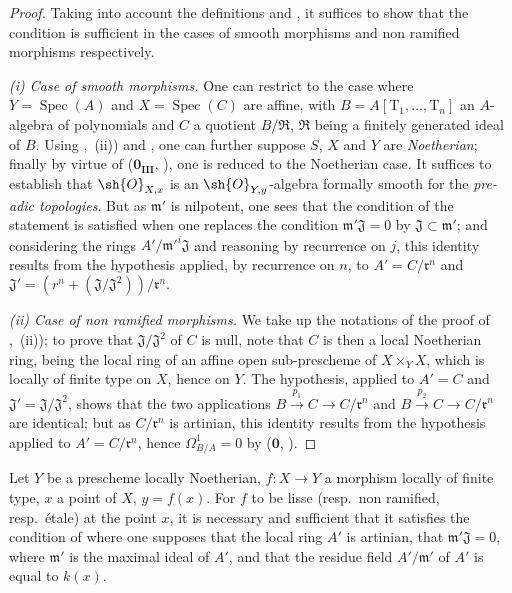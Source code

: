\begin{proof}
Taking into account the definitions  and , it suffices to show that the condition is sufficient in the cases of smooth morphisms and non ramified morphisms respectively.

\emph{(i) Case of smooth morphisms.}
One can restrict to the case where $Y=\operatorname{Spec}(A)$ and $X=\operatorname{Spec}(C)$ are affine, with $B=A[\mathrm{T}_1,\ldots,\mathrm{T}_n]$ an $A$-algebra of polynomials and $C$ a quotient $B/\mathfrak{R}$, $\mathfrak{R}$ being a finitely generated ideal of $B$.
Using ,~(ii)) and , one can further suppose $S$, $X$ and $Y$ are \emph{Noetherian}; finally by virtue of ($\mathbf{0_{III}}$, ), one is reduced to the Noetherian case.
It suffices to establish that $\sh{O}_{X,x}$ is an $\sh{O}_{Y,y}$-algebra formally smooth for the \emph{pre-adic topologies}.
But as $\mathfrak{m}'$ is nilpotent, one sees that the condition of the statement is satisfied when one replaces the condition $\mathfrak{m}'\mathfrak{J}=0$ by $\mathfrak{J}\subset\mathfrak{m}'$; and considering the rings $A'/\mathfrak{m}'^i\mathfrak{J}$ and reasoning by recurrence on $j$, this identity results from the hypothesis applied, by recurrence on $n$, to $A'=C/\mathfrak{r}^n$ and $\mathfrak{J}'=(r^n+(\mathfrak{J}/\mathfrak{J}^2))/\mathfrak{r}^n$.

\emph{(ii) Case of non ramified morphisms.}
We take up the notations of the proof of ,~(ii)); to prove that $\mathfrak{J}/\mathfrak{J}^2$ of $C$ is null, note that $C$ is then a local Noetherian ring, being the local ring of an affine open sub-prescheme of $X\times_Y X$, which is locally of finite type on $X$, hence on $Y$.
The hypothesis, applied to $A'=C$ and $\mathfrak{J}'=\mathfrak{J}/\mathfrak{J}^2$, shows that the two applications $B\xrightarrow{p_1}C\to C/\mathfrak{r}^n$ and $B\xrightarrow{p_2}C\to C/\mathfrak{r}^n$ are identical; but as $C/\mathfrak{r}^n$ is artinian, this identity results from the hypothesis applied to $A'=C/\mathfrak{r}^n$, hence $\Omega^1_{B/A}=0$ by ($\mathbf{0}$, ).
\end{proof}

\begin{proposition}[17.14.2]
\label{IV.17.14.2}
Let $Y$ be a prescheme locally Noetherian, $f:X\to Y$ a morphism locally of finite type, $x$ a point of $X$, $y=f(x)$.
For $f$ to be lisse (resp.\ non ramified, resp.\ \'etale) at the point $x$, it is necessary and sufficient that it satisfies the condition of  where one supposes that the local ring $A'$ is artinian, that $\mathfrak{m}'\mathfrak{J}=0$, where $\mathfrak{m}'$ is the maximal ideal of $A'$, and that the residue field $A'/\mathfrak{m}'$ of $A'$ is equal to $k(x)$.
\end{proposition}

